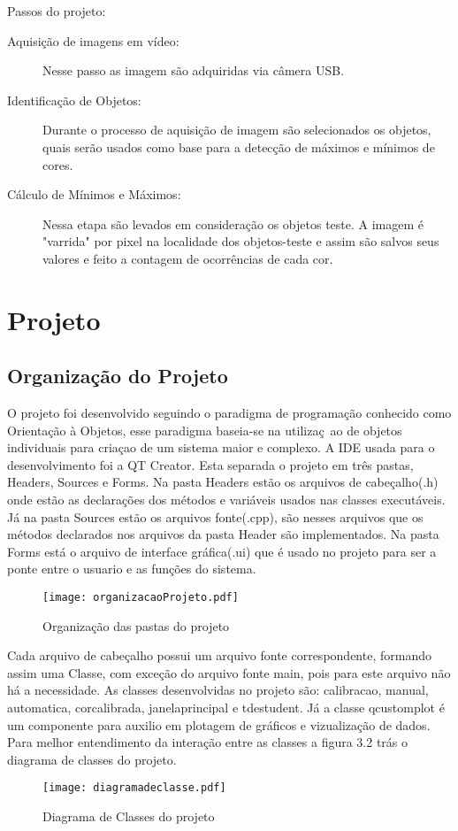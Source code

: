 	
	Passos do projeto:
	\begin{description}
		\item[Aquisição de imagens em vídeo:] Nesse passo as imagem são adquiridas via câmera USB.
		
		\item[Identificação de Objetos:]
				 Durante o processo de aquisição de imagem são selecionados os objetos, quais serão usados como base para a detecção de máximos e mínimos de cores.
		\item [Cálculo de Mínimos e Máximos:]
		 Nessa etapa são levados em consideração os objetos teste. A imagem é "varrida"  por pixel na localidade dos objetos-teste e assim são salvos seus valores e feito a contagem de ocorrências de cada cor.		
	\end{description}


	\section{Projeto}
	\subsection{Organização do Projeto}
	 O projeto foi desenvolvido seguindo o paradigma de programação conhecido como  Orientação à Objetos, esse paradigma baseia-se na utilizaç~ao de objetos individuais para criaçao de um sistema maior e complexo. A IDE usada para o desenvolvimento foi a QT Creator. Esta separada o projeto em três pastas, Headers, Sources e Forms. Na pasta Headers estão os arquivos de cabeçalho(.h) onde estão as declarações dos métodos e variáveis usados nas classes  executáveis. Já na pasta Sources estão os arquivos fonte(.cpp), são nesses arquivos que os métodos declarados nos arquivos da pasta Header são implementados. Na pasta Forms está o arquivo de interface gráfica(.ui) que é usado no projeto para ser a ponte entre o usuario e as funções do sistema.
	 
	\begin{figure}[!h]
		\centering
		\texttt{[image: organizacaoProjeto.pdf]}
		\caption{Organização das pastas do projeto}
		\label{Organizacao do Projeto}
	\end{figure}
	Cada arquivo de cabeçalho possui um arquivo fonte correspondente, formando assim uma Classe, com exceção do arquivo fonte main, pois para este arquivo não há a necessidade.
	As classes desenvolvidas no projeto são:
 calibracao, manual, automatica, corcalibrada, janelaprincipal e tdestudent. Já a classe qcustomplot é um componente para auxilio em plotagem de gráficos e vizualização de dados\cite{QCustomPlot}.
Para melhor entendimento da interação entre as classes a figura 3.2 trás o diagrama de classes do projeto.
	 \begin{figure}[!h]
	 	\centering
	 	\texttt{[image: diagramadeclasse.pdf]}
	 	\caption{Diagrama de Classes do projeto}
	 	\label{DiagramaDeClasse}
	 \end{figure}\newpage


